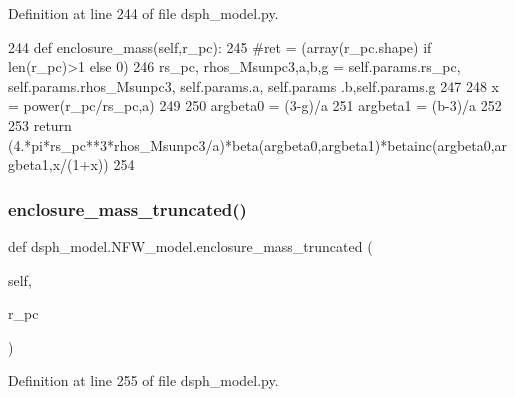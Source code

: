 Definition at line 244 of file dsph\+\_\+model.\+py.


\begin{DoxyCode}
244     \textcolor{keyword}{def }enclosure\_mass(self,r\_pc):
245         \textcolor{comment}{#ret = (array(r\_pc.shape) if len(r\_pc)>1 else 0)}
246         rs\_pc, rhos\_Msunpc3,a,b,g = self.params.rs\_pc, self.params.rhos\_Msunpc3, self.params.a, self.params
      .b,self.params.g
247         
248         x = power(r\_pc/rs\_pc,a)
249         
250         argbeta0 = (3-g)/a
251         argbeta1 = (b-3)/a
252         
253         \textcolor{keywordflow}{return} (4.*pi*rs\_pc**3*rhos\_Msunpc3/a)*beta(argbeta0,argbeta1)*betainc(argbeta0,argbeta1,x/(1+x)) 
254     
\end{DoxyCode}
\mbox{\label{classdsph__model_1_1NFW__model_ae7c0832d2a9c3edbccdfcffa40987046}} 
\subsubsection{\texorpdfstring{enclosure\+\_\+mass\+\_\+truncated()}{enclosure\_mass\_truncated()}}
{\footnotesize\ttfamily def dsph\+\_\+model.\+N\+F\+W\+\_\+model.\+enclosure\+\_\+mass\+\_\+truncated (\begin{DoxyParamCaption}\item[{}]{self,  }\item[{}]{r\+\_\+pc }\end{DoxyParamCaption})}



Definition at line 255 of file dsph\+\_\+model.\+py.


